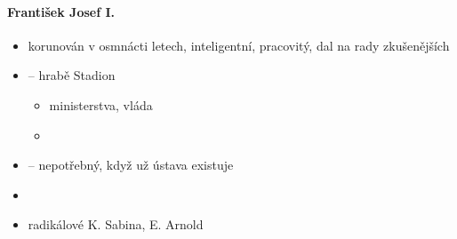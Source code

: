 \paragraph{František Josef I.}
\begin{itemize}
\item korunován v osmnácti letech, inteligentní, pracovitý, dal na rady zkušenějších
\item {} -- hrabě Stadion
	\begin{itemize}
	\item ministerstva, vláda
	\item 
	\end{itemize}
\item {} -- nepotřebný, když už ústava existuje
\item {}
\item radikálové K. Sabina, E. Arnold
\end{itemize}

